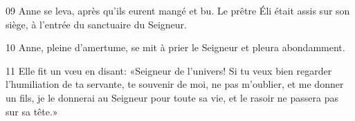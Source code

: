 
09 Anne se leva, après qu’ils eurent mangé et bu. Le prêtre Éli était assis sur son siège, à l’entrée du sanctuaire du Seigneur.

10 Anne, pleine d’amertume, se mit à prier le Seigneur et pleura abondamment.

11 Elle fit un vœu en disant: «Seigneur de l’univers! Si tu veux bien regarder l’humiliation de ta servante, te souvenir de moi, ne pas m’oublier, et me donner un fils, je le donnerai au Seigneur pour toute sa vie, et le rasoir ne passera pas sur sa tête.»